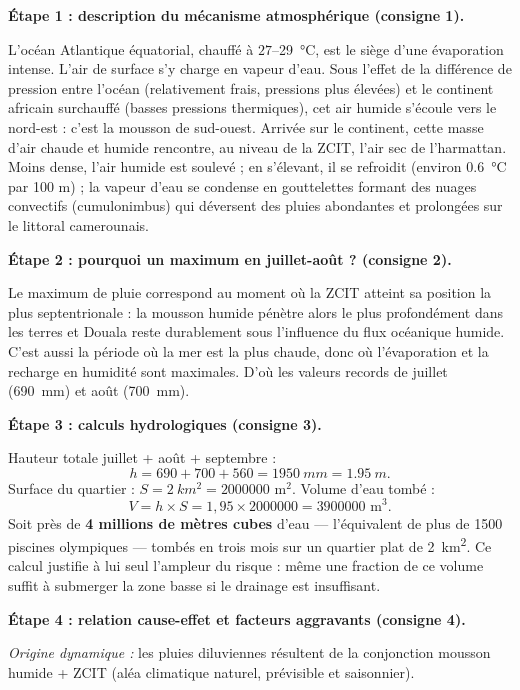 \documentclass[11pt]{article}
\newcommand{\cle}[1]{{\popxbold\color{popdark}#1}}
\begin{document}
\begin{exoresolu}
\textbf{Étape 1 : description du mécanisme atmosphérique (consigne 1).}

L'océan Atlantique équatorial, chauffé à $27$--\SI{29}{\celsius}, est le siège d'une évaporation intense. L'air de surface s'y charge en vapeur d'eau. Sous l'effet de la différence de pression entre l'océan (relativement frais, pressions plus élevées) et le continent africain surchauffé (basses pressions thermiques), cet air humide s'écoule vers le nord-est : c'est la \cle{mousson de sud-ouest}. Arrivée sur le continent, cette masse d'air chaude et humide rencontre, au niveau de la ZCIT, l'air sec de l'harmattan. Moins dense, l'air humide est soulevé ; en s'élevant, il se refroidit (environ \SI{0,6}{\celsius} par 100 m) ; la vapeur d'eau se condense en gouttelettes formant des nuages convectifs (cumulonimbus) qui déversent des pluies abondantes et prolongées sur le littoral camerounais.

\tcblower

\textbf{Étape 2 : pourquoi un maximum en juillet-août ? (consigne 2).}

Le maximum de pluie correspond au moment où la ZCIT atteint sa position la plus septentrionale : la mousson humide pénètre alors le plus profondément dans les terres et Douala reste durablement sous l'influence du flux océanique humide. C'est aussi la période où la mer est la plus chaude, donc où l'évaporation et la recharge en humidité sont maximales. D'où les valeurs records de juillet (\SI{690}{mm}) et août (\SI{700}{mm}).

\textbf{Étape 3 : calculs hydrologiques (consigne 3).}

Hauteur totale juillet + août + septembre :
\[ h = 690 + 700 + 560 = \SI{1950}{mm} = \SI{1,95}{m}. \]
Surface du quartier : $S = \SI{2}{km^2} = \num{2000000}$ m$^2$.
Volume d'eau tombé :
\[ V = h \times S = 1,95 \times \num{2000000} = \num{3900000} \text{ m}^3. \]
Soit près de \textbf{4 millions de mètres cubes} d'eau — l'équivalent de plus de \num{1500} piscines olympiques — tombés en trois mois sur un quartier plat de \SI{2}{km^2}. Ce calcul justifie à lui seul l'ampleur du risque : même une fraction de ce volume suffit à submerger la zone basse si le drainage est insuffisant.

\textbf{Étape 4 : relation cause-effet et facteurs aggravants (consigne 4).}

\emph{Origine dynamique :} les pluies diluviennes résultent de la conjonction mousson humide + ZCIT (aléa climatique naturel, prévisible et saisonnier).


\end{exoresolu}
\end{document}

